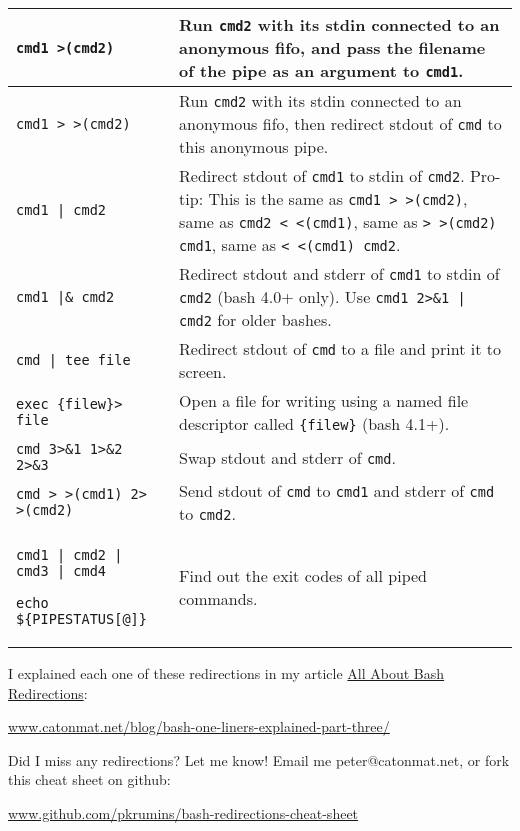\documentclass[9pt]{memoir}
\begin{document}
\begin{tabular}{|m{5.5cm}|m{12.2cm}|}
\hline
\verb/cmd1 >(cmd2)/ & Run \verb|cmd2| with its stdin connected to an anonymous fifo, and pass the filename of the pipe as an argument to \verb|cmd1|. \\
\hline
\verb/cmd1 > >(cmd2)/ & Run \verb|cmd2| with its stdin connected to an anonymous fifo, then redirect stdout of \verb|cmd| to this anonymous pipe. \\
\hline
\verb/cmd1 | cmd2/ & Redirect stdout of \verb|cmd1| to stdin of \verb|cmd2|. Pro-tip: This is the same as \verb|cmd1 > >(cmd2)|, same as \verb|cmd2 < <(cmd1)|, same as \verb|> >(cmd2) cmd1|, same as \verb|< <(cmd1) cmd2|. \\
\hline
\verb/cmd1 |& cmd2/ & Redirect stdout and stderr of \verb|cmd1| to stdin of \verb|cmd2| (bash 4.0+ only). Use \verb/cmd1 2>&1 | cmd2/ for older bashes. \\
\hline
\verb/cmd | tee file/ & Redirect stdout of \verb|cmd| to a file and print it to screen. \\
\hline
\verb|exec {filew}> file| & Open a file for writing using a named file descriptor called \verb|{filew}| (bash 4.1+). \\
\hline
\verb|cmd 3>&1 1>&2 2>&3| & Swap stdout and stderr of \verb|cmd|. \\
\hline
\verb|cmd > >(cmd1) 2> >(cmd2)| & Send stdout of \verb|cmd| to \verb|cmd1| and stderr of \verb|cmd| to \verb|cmd2|. \\
\hline
\verb/cmd1 | cmd2 | cmd3 | cmd4/ \par
\verb/echo ${PIPESTATUS[@]}/ & Find out the exit codes of all piped commands. \\
\hline
\end{tabular}

\vfill

I explained each one of these redirections in my article \href{http://www.catonmat.net/blog/bash-one-liners-explained-part-three/}{All About Bash Redirections}: \par
\href{http://www.catonmat.net/blog/bash-one-liners-explained-part-three/}{www.catonmat.net/blog/bash-one-liners-explained-part-three/}

\vfill

Did I miss any redirections? Let me know! Email me peter@catonmat.net, or fork this cheat sheet on github: \par \href{http://github.com/pkrumins/bash-redirections-cheat-sheet}{www.github.com/pkrumins/bash-redirections-cheat-sheet}

\vfill

\end{document}
